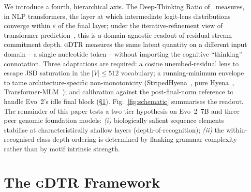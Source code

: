 \documentclass{article}
\theoremstyle{plain}
\theoremstyle{definition}
\theoremstyle{remark}
\newcommand{\gDTR}{\textsc{gDTR}}
\begin{document}
We introduce a fourth, hierarchical axis. The Deep-Thinking Ratio of~\citet{chen2026deepthinking} measures, in NLP transformers, the layer at which intermediate logit-lens distributions~\cite{nostalgebraist2020logitlens,belrose2023tunedlens,pal2023futurelens} converge within $\varepsilon$ of the final layer; under the iterative-refinement view of transformer prediction~\cite{geva2022ffn,meng2022rome}, this is a domain-agnostic readout of residual-stream commitment depth. \gDTR{} measures the same latent quantity on a different input domain -- a single nucleotide token -- without importing the cognitive ``thinking'' connotation. Three adaptations are required: a cosine unembed-residual lens to escape JSD saturation in the $|V|\!\le\!512$ vocabulary; a running-minimum envelope to tame architecture-specific non-monotonicity (StripedHyena~\cite{poli2023striped}, pure Hyena~\cite{poli2023hyena}, Transformer-MLM~\cite{vaswani2017attention}); and calibration against the post-final-norm reference to handle Evo~2's idle final block (\S\ref{sec:framework}). Fig.~\ref{fig:schematic} summarises the readout. The remainder of this paper tests a two-tier hypothesis on Evo~2~7B and three peer genomic foundation models: \emph{(i)} biologically salient sequence elements stabilise at characteristically shallow layers (depth-of-recognition); \emph{(ii)} the within-recognised-class depth ordering is determined by flanking-grammar complexity rather than by motif intrinsic strength.


\section{The \gDTR{} Framework}
\label{sec:framework}
\end{document}
